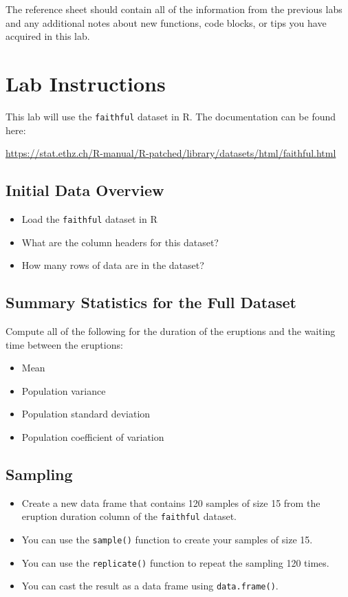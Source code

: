 \documentclass{article}
\begin{document}
The reference sheet should contain all of the information from the previous labs and any additional notes about new functions, code blocks, or tips you have acquired in this lab.

\section{Lab Instructions}

This lab will use the \texttt{faithful} dataset in R. The documentation can be found here:

\url{https://stat.ethz.ch/R-manual/R-patched/library/datasets/html/faithful.html}

\subsection{Initial Data Overview}

\begin{itemize}
    \item Load the \texttt{faithful} dataset in R
    \item What are the column headers for this dataset?
    \item How many rows of data are in the dataset?
\end{itemize}

\subsection{Summary Statistics for the Full Dataset}

Compute all of the following for the duration of the eruptions and the waiting time between the eruptions:

\begin{itemize}
    \item Mean
    \item Population variance
    \item Population standard deviation
    \item Population coefficient of variation
\end{itemize}

\subsection{Sampling}

\begin{itemize}
    \item Create a new data frame that contains 120 samples of size 15 from the eruption duration column of the \texttt{faithful} dataset.
    \item You can use the \texttt{sample()} function to create your samples of size 15.
    \item You can use the \texttt{replicate()} function to repeat the sampling 120 times.
    \item You can cast the result as a data frame using \texttt{data.frame()}.
\end{itemize}
\end{document}

